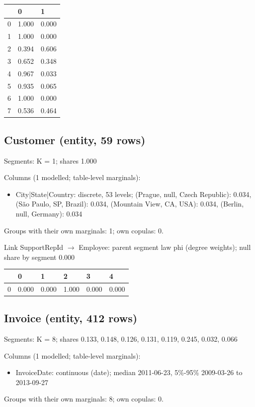 \documentclass[10pt]{article}
\begin{document}
{\footnotesize\begin{longtable}{lll}
 & 0 & 1 \\ \hline
0 & 1.000 & 0.000 \\
1 & 1.000 & 0.000 \\
2 & 0.394 & 0.606 \\
3 & 0.652 & 0.348 \\
4 & 0.967 & 0.033 \\
5 & 0.935 & 0.065 \\
6 & 1.000 & 0.000 \\
7 & 0.536 & 0.464 \\
\end{longtable}}


\subsection*{Customer (entity, 59 rows)}
Segments: K = 1; shares 1.000

Columns (1 modelled; table-level marginals):


\begin{itemize}
\item City|State|Country: discrete, 53 levels; (Prague, null, Czech Republic): 0.034, (São Paulo, SP, Brazil): 0.034, (Mountain View, CA, USA): 0.034, (Berlin, null, Germany): 0.034
\end{itemize}
Groups with their own marginals: 1; own copulas: 0.


Link SupportRepId $\rightarrow$ Employee: parent segment law phi (degree weights); null share by segment 0.000


{\footnotesize\begin{longtable}{llllll}
 & 0 & 1 & 2 & 3 & 4 \\ \hline
0 & 0.000 & 0.000 & 1.000 & 0.000 & 0.000 \\
\end{longtable}}


\subsection*{Invoice (entity, 412 rows)}
Segments: K = 8; shares 0.133, 0.148, 0.126, 0.131, 0.119, 0.245, 0.032, 0.066

Columns (1 modelled; table-level marginals):


\begin{itemize}
\item InvoiceDate: continuous (date); median 2011-06-23, 5\%-95\% 2009-03-26 to 2013-09-27
\end{itemize}
Groups with their own marginals: 8; own copulas: 0.
\end{document}
